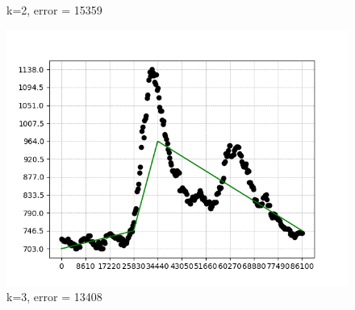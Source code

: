 \documentclass{article}
\begin{document}
\begin{figure}[ht]
\begin{minipage}{.3\textwidth}
        \caption{k=2, error = 15359}
    \end{minipage}%
    \begin{minipage}{.3\textwidth}
        \centering
        \includegraphics[width=.9\linewidth]{graficos/solution_11x11,3N_optimistic_instance.png}
        \caption{k=3, error = 13408}
    \end{minipage}%
\end{figure}
\end{document}
